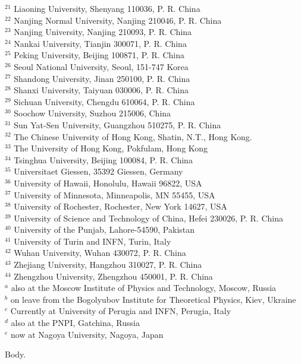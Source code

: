 \begin{frontmatter}
{\begin{small}
{$^{21}$ Liaoning University, Shenyang 110036, P. R. China\\
$^{22}$ Nanjing Normal University, Nanjing 210046, P. R. China\\
$^{23}$ Nanjing University, Nanjing 210093, P. R. China\\
$^{24}$ Nankai University, Tianjin 300071, P. R. China\\
$^{25}$ Peking University, Beijing 100871, P. R. China\\
$^{26}$ Seoul National University, Seoul, 151-747 Korea\\
$^{27}$ Shandong University, Jinan 250100, P. R. China\\
$^{28}$ Shanxi University, Taiyuan 030006, P. R. China\\
$^{29}$ Sichuan University, Chengdu 610064, P. R. China\\
$^{30}$ Soochow University, Suzhou 215006, China\\
$^{31}$ Sun Yat-Sen University, Guangzhou 510275, P. R. China\\
$^{32}$ The Chinese University of Hong Kong, Shatin, N.T., Hong Kong.\\
$^{33}$ The University of Hong Kong, Pokfulam, Hong Kong\\
$^{34}$ Tsinghua University, Beijing 100084, P. R. China\\
$^{35}$ Universitaet Giessen, 35392 Giessen, Germany\\
$^{36}$ University of Hawaii, Honolulu, Hawaii 96822, USA\\
$^{37}$ University of Minnesota, Minneapolis, MN 55455, USA\\
$^{38}$ University of Rochester, Rochester, New York 14627, USA\\
$^{39}$ University of Science and Technology of China, Hefei 230026, P. R. China\\
$^{40}$ University of the Punjab, Lahore-54590, Pakistan\\
$^{41}$ University of Turin and INFN, Turin, Italy\\
$^{42}$ Wuhan University, Wuhan 430072, P. R. China\\
$^{43}$ Zhejiang University, Hangzhou 310027, P. R. China\\
$^{44}$ Zhengzhou University, Zhengzhou 450001, P. R. China\\
\vspace{0.2cm}
$^{a}$ also at the Moscow Institute of Physics and Technology, Moscow, Russia\\
$^{b}$ on leave from the Bogolyubov Institute for Theoretical Physics, Kiev, Ukraine\\
$^{c}$ Currently at University of Perugia and INFN, Perugia, Italy\\
$^{d}$ also at the PNPI, Gatchina, Russia\\
$^{e}$ now at Nagoya University, Nagoya, Japan\\
\vspace{7cm}
}
\end{small}
}
\begin{abstract}
A.
\end{abstract}
\end{frontmatter}
Body.

